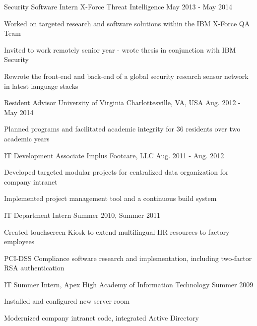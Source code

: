 \begin{cventries}
  \cventry
    {Security Software Intern \enskip\textendash\enskip X-Force Threat Intelligence}
    {}
    {} %
    {May 2013 - May 2014}
    {
    \begin{cvitems}
      \item {Worked on targeted research and software solutions within the IBM X-Force QA Team}
      \item {Invited to work remotely senior year - wrote thesis in conjunction with IBM Security}
      \item {Rewrote the front-end and back-end of a global security research sensor network in latest language stacks}
    \end{cvitems}
    }

  \cventry
    {Resident Advisor}
    {University of Virginia}
    {Charlottesville, VA, USA}
    {Aug. 2012 - May 2014}
    {
      \begin{cvitems}
	      \item {Planned programs and facilitated academic integrity for 36 residents over two academic years}
      \end{cvitems}
    }

  \cventry
    {IT Development Associate}
    {Implus Footcare, LLC}
    {}
    {Aug. 2011 - Aug. 2012}
    {
      \begin{cvitems}
        \item Developed targeted modular projects for centralized data organization for company intranet
        \item Implemented project management tool and a continuous build system
      \end{cvitems}
    }

  \cventry
  {IT Department Intern}
  {}
  {}
  {Summer 2010, Summer 2011}
  {
    \begin{cvitems}
      \item Created touchscreen Kiosk to extend multilingual HR resources to factory employees
      \item PCI-DSS Compliance software research and implementation, including two-factor RSA authentication
    \end{cvitems}
  }

  \cventry
  {IT Summer Intern, Apex High Academy of Information Technology}
  {}
  {}
  {Summer 2009}
  {
    \begin{cvitems}
      \item Installed and configured new server room
      \item Modernized company intranet code, integrated Active Directory
    \end{cvitems}
  }

\end{cventries}
